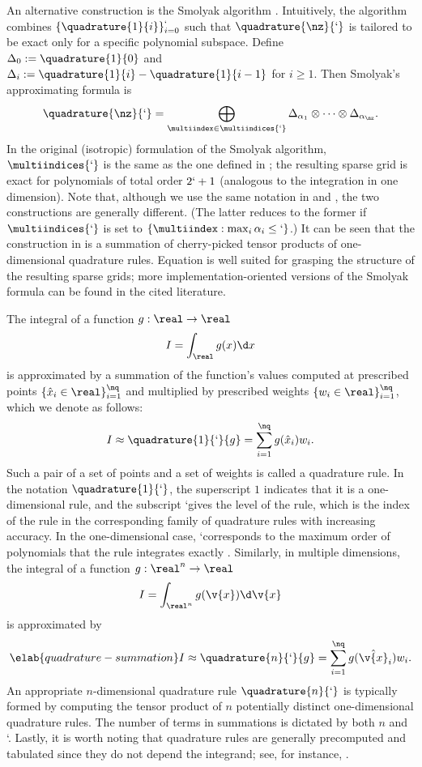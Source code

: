 An alternative construction is the Smolyak algorithm \cite{maitre2010,
eldred2008}. Intuitively, the algorithm combines $\{ \quadrature{1}{i} \}_{i =
0}^\lq$ such that $\quadrature{\nz}{\lq}$ is tailored to be exact only for a
specific polynomial subspace. Define $\Delta_0 := \quadrature{1}{0}$ and
$\Delta_i := \quadrature{1}{i} - \quadrature{1}{i - 1}$ for $i \geq 1$. Then
Smolyak's approximating formula is
\[
  \quadrature{\nz}{\lq} = \bigoplus_{\multiindex \in \multiindices{\lq}} \Delta_{\alpha_1} \otimes \cdots \otimes \Delta_{\alpha_\nz}.
\]
In the original (isotropic) formulation of the Smolyak algorithm,
$\multiindices{\lq}$ is the same as the one defined in
; the resulting sparse grid is exact for
polynomials of total order $2 \lq + 1$ (analogous to the integration in one
dimension). Note that, although we use the same notation in
 and , the two
constructions are generally different. (The latter reduces to the former if
$\multiindices{\lq}$ is set to $\{ \multiindex: \max_i \alpha_i
\leq \lq \}$.) It can be seen that the construction in
 is a summation of cherry-picked tensor products of
one-dimensional quadrature rules. Equation  is well
suited for grasping the structure of the resulting sparse grids; more
implementation-oriented versions of the Smolyak formula can be found in the
cited literature.

The integral of a function $g: \real \to \real$
\[
  I = \int_\real g(x) \d x
\]
is approximated by a summation of the function's values computed at prescribed
points $\{ \hat{x}_i \in \real \}_{i = 1}^\nq$ and multiplied by prescribed
weights $\{ w_i \in \real \}_{i = 1}^\nq$, which we denote as follows:
\[
  I \approx \quadrature{1}{\lq}{g} = \sum_{i = 1}^\nq g(\hat{x}_i) w_i.
\]
Such a pair of a set of points and a set of weights is called a quadrature rule.
In the notation $\quadrature{1}{\lq}$, the superscript $1$ indicates that it is
a one-dimensional rule, and the subscript \lq gives the level of the rule, which
is the index of the rule in the corresponding family of quadrature rules with
increasing accuracy. In the one-dimensional case, \lq corresponds to the maximum
order of polynomials that the rule integrates exactly \cite{heiss2008}.
Similarly, in multiple dimensions, the integral of a function $g: \real^n \to
\real$
\[
  I = \int_{\real^n} g(\v{x}) \d \v{x}
\]
is approximated by
\begin{equation} \elab{quadrature-summation}
  I \approx \quadrature{n}{\lq}{g} = \sum_{i = 1}^\nq g(\hat{\v{x}}_i) w_i.
\end{equation}
An appropriate $n$-dimensional quadrature rule $\quadrature{n}{\lq}$ is
typically formed by computing the tensor product of $n$ potentially distinct
one-dimensional quadrature rules. The number of terms \nq in summations is
dictated by both $n$ and \lq. Lastly, it is worth noting that quadrature rules
are generally precomputed and tabulated since they do not depend the integrand;
see, for instance, \cite{burkardt}.

